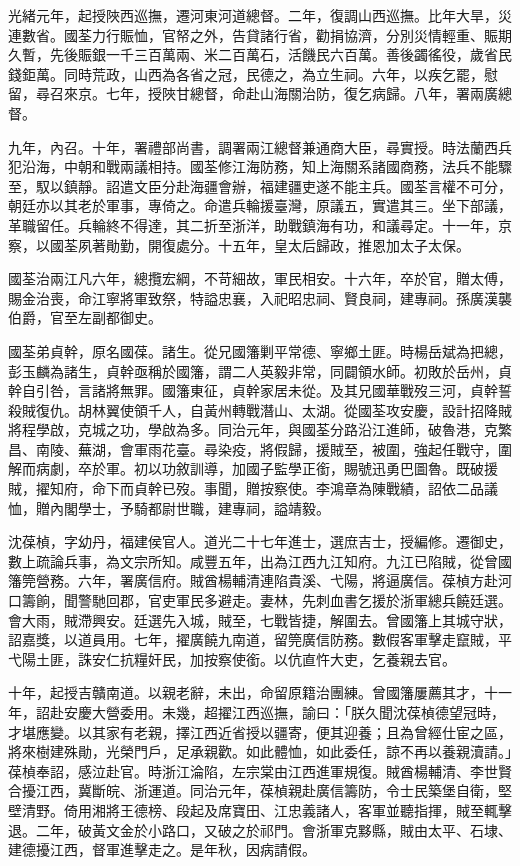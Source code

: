 \begin{pinyinscope}
光緒元年，起授陜西巡撫，遷河東河道總督。二年，復調山西巡撫。比年大旱，災連數省。國荃力行賑恤，官帑之外，告貸諸行省，勸捐協濟，分別災情輕重、賑期久暫，先後賑銀一千三百萬兩、米二百萬石，活饑民六百萬。善後蠲徭役，歲省民錢鉅萬。同時荒政，山西為各省之冠，民德之，為立生祠。六年，以疾乞罷，慰留，尋召來京。七年，授陜甘總督，命赴山海關治防，復乞病歸。八年，署兩廣總督。

九年，內召。十年，署禮部尚書，調署兩江總督兼通商大臣，尋實授。時法蘭西兵犯沿海，中朝和戰兩議相持。國荃修江海防務，知上海關系諸國商務，法兵不能驟至，馭以鎮靜。詔遣文臣分赴海疆會辦，福建疆吏遂不能主兵。國荃言權不可分，朝廷亦以其老於軍事，專倚之。命遣兵輪援臺灣，原議五，實遣其三。坐下部議，革職留任。兵輪終不得達，其二折至浙洋，助戰鎮海有功，和議尋定。十一年，京察，以國荃夙著勛勤，開復處分。十五年，皇太后歸政，推恩加太子太保。

國荃治兩江凡六年，總攬宏綱，不苛細故，軍民相安。十六年，卒於官，贈太傅，賜金治喪，命江寧將軍致祭，特謚忠襄，入祀昭忠祠、賢良祠，建專祠。孫廣漢襲伯爵，官至左副都御史。

國荃弟貞幹，原名國葆。諸生。從兄國籓剿平常德、寧鄉土匪。時楊岳斌為把總，彭玉麟為諸生，貞幹亟稱於國籓，謂二人英毅非常，同闢領水師。初敗於岳州，貞幹自引咎，言諸將無罪。國籓東征，貞幹家居未從。及其兄國華戰歿三河，貞幹誓殺賊復仇。胡林翼使領千人，自黃州轉戰潛山、太湖。從國荃攻安慶，設計招降賊將程學啟，克城之功，學啟為多。同治元年，與國荃分路沿江進師，破魯港，克繁昌、南陵、蕪湖，會軍雨花臺。尋染疫，將假歸，援賊至，被圍，強起任戰守，圍解而病劇，卒於軍。初以功敘訓導，加國子監學正銜，賜號迅勇巴圖魯。既破援賊，擢知府，命下而貞幹已歿。事聞，贈按察使。李鴻章為陳戰績，詔依二品議恤，贈內閣學士，予騎都尉世職，建專祠，謚靖毅。

沈葆楨，字幼丹，福建侯官人。道光二十七年進士，選庶吉士，授編修。遷御史，數上疏論兵事，為文宗所知。咸豐五年，出為江西九江知府。九江已陷賊，從曾國籓筦營務。六年，署廣信府。賊酋楊輔清連陷貴溪、弋陽，將逼廣信。葆楨方赴河口籌餉，聞警馳回郡，官吏軍民多避走。妻林，先刺血書乞援於浙軍總兵饒廷選。會大雨，賊滯興安。廷選先入城，賊至，七戰皆捷，解圍去。曾國籓上其城守狀，詔嘉獎，以道員用。七年，擢廣饒九南道，留筦廣信防務。數假客軍擊走竄賊，平弋陽土匪，誅安仁抗糧奸民，加按察使銜。以伉直忤大吏，乞養親去官。

十年，起授吉贛南道。以親老辭，未出，命留原籍治團練。曾國籓屢薦其才，十一年，詔赴安慶大營委用。未幾，超擢江西巡撫，諭曰：「朕久聞沈葆楨德望冠時，才堪應變。以其家有老親，擇江西近省授以疆寄，便其迎養；且為曾經仕宦之區，將來樹建殊勛，光榮門戶，足承親歡。如此體恤，如此委任，諒不再以養親瀆請。」葆楨奉詔，感泣赴官。時浙江淪陷，左宗棠由江西進軍規復。賊酋楊輔清、李世賢合擾江西，冀斷皖、浙運道。同治元年，葆楨親赴廣信籌防，令士民築堡自衛，堅壁清野。倚用湘將王德榜、段起及席寶田、江忠義諸人，客軍並聽指揮，賊至輒擊退。二年，破黃文金於小路口，又破之於祁門。會浙軍克黟縣，賊由太平、石埭、建德擾江西，督軍進擊走之。是年秋，因病請假。


\end{pinyinscope}
